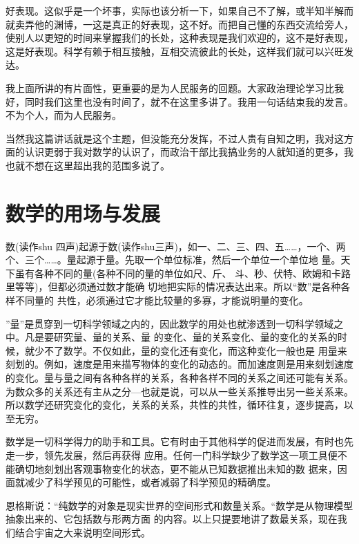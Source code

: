 \documentclass[twoside,openright,headings=optiontohead]{ctexbook} %
\begin{document}
{好表现。这似乎是一个坏事，实际也该分析一下，如果自己不了解，或半知半解而就卖弄他的渊博，一这是真正的好表现，这不好。而把自己懂的东西交流给旁人，使别人以更短的时间来掌握我们的长处，这种表现是我们欢迎的，这不是好表现，这是好表现。科学有赖于相互接触，互相交流彼此的长处，这样我们就可以兴旺发达。

我上面所讲的有片面性，更重要的是为人民服务的回题。大家政治理论学习比我好，同时我们这里也没有时间了，就不在这里多讲了。我用一句话结束我的发言。\\
不为个人，而为人民服务。

当然我这篇讲话就是这个主题，但没能充分发挥，不过人贵有自知之明，我对这方面的认识更弱于我对数学的认识了，而政治干部比我搞业务的人就知道的更多，我也就不想在这里超出我的范围多说了。

\hypertarget{ux6570ux5b66ux7684ux7528ux573aux4e0eux53d1ux5c55}{%
\chapter*{数学的用场与发展}\label{ux6570ux5b66ux7684ux7528ux573aux4e0eux53d1ux5c55}}

数(读作shu 四声)起源于数(读作shu三声)，如一、二、三、四、五\ldots{}\ldots{}，一个、两个、三个\ldots{}\ldots{}。量起源于量。先取一个单位标准，然后一个单位一个单位地
量。天下虽有各种不同的量(各种不同的量的单位如尺、斤、 斗、秒、伏特、欧姆和卡路里等等)，但都必须通过数才能确
切地把实际的情况表达出来。所以``数''是各种各样不同量的 共性，必须通过它才能比较量的多寡，才能说明量的变化。

''量''是贯穿到一切科学领域之内的，因此数学的用处也就渗透到一切科学领域之中。凡是要研究量、量的关系、量
的变化、量的关系变化、量的变化的关系的时候，就少不了数学。不仅如此，量的变化还有变化，而这种变化一般也是
用量来刻划的。例如，速度是用来描写物体的变化的动态的。而加速度则是用来刻划速度的变化。量与量之间有各种各样的关系，各种各样不同的关系之间还可能有关系。为数众多的关系还有主从之分---也就是说，可以从一些关系推导出另一些关系来。所以数学还研究变化的变化，关系的关系，共性的共性，循环往复，逐步提高，以至无穷。

数学是一切科学得力的助手和工具。它有时由于其他科学的促进而发展，有时也先走一步，领先发展，然后再获得
应用。任何一门科学缺少了数学这一项工具便不能确切地刻划出客观事物变化的状态，更不能从已知数据推出未知的数
据来，因面就减少了科学预见的可能性，或者减弱了科学预见的精确度。

恩格斯说：``纯数学的对象是现实世界的空间形式和数量关系。``数学是从物理模型抽象出来的、它包括数与形两方面
的内容。以上只提要地讲了数最关系，现在我们结合宇宙之大来说明空间形式。

}
\end{document}
